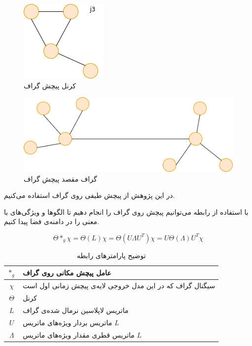 \begin{figure}
  \includegraphics[]{./images/graph-convolution-kernel.png}
  \centering
  \caption{کرنل پیچش گراف}
  \label{fig:graph-convolution-kernel}
\end{figure}

\begin{figure}
  \includegraphics[]{./images/graph-convolution-graph.png}
  \centering
  \caption{گراف مقصد پیچش گراف}
  \label{fig:graph-convolution-graph}
\end{figure}

در این پژوهش از پیچش طیفی روی گراف‌ استفاده می‌کنیم. 

با استفاده از رابطه  می‌توانیم پیچش روی گراف را انجام دهیم تا الگوها و ویژگی‌های با معنی را در دامنه‌ی فضا پیدا کنیم.

\begin{equation}
  \Theta *_{g} \chi = \Theta(L)\chi = \Theta(U \Lambda U^{T})\chi = U\Theta(\Lambda)U^{T}\chi
  \label{eq:convolution}
\end{equation}

\begin{table}[h]
  \centering
  \caption{توضیح پارامترهای رابطه }
  \begin{tabular}{|c|p{}|}
    \hline
    $*_{g}$ & عامل پیچش مکانی روی گراف \\
    \hline
    $\chi$ & سیگنال گراف که در این مدل خروجی لایه‌ی پیچش زمانی اول است \\
    \hline
    $\Theta$ & کرنل \\
    \hline
    $L$ & ماتریس لاپلاسین نرمال شده‌ی گراف \\
    \hline
    $U$ & ماتریس بردار ویژه‌های ماتریس $L$ \\
    \hline
    $\Lambda$ & ماتریس قطری مقدار ویژه‌های ماتریس $L$ \\
    \hline
  \end{tabular}
  \label{tbl:distance}
\end{table}

